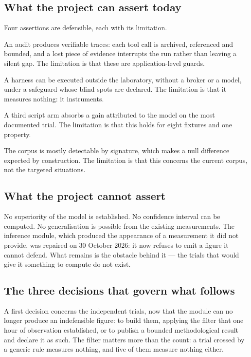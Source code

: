 \subsection{What the project can assert today}

Four assertions are defensible, each with its limitation.

An audit produces verifiable traces: each tool call is archived, referenced and bounded, and a lost piece of evidence interrupts the run rather than leaving a silent gap. The limitation is that these are application-level guards.

A harness can be executed outside the laboratory, without a broker or a model, under a safeguard whose blind spots are declared. The limitation is that it measures nothing: it instruments.

A third script arm absorbs a gain attributed to the model on the most documented trial. The limitation is that this holds for eight fixtures and one property.

The corpus is mostly detectable by signature, which makes a null difference expected by construction. The limitation is that this concerns the current corpus, not the targeted situations.

\subsection{What the project cannot assert}

No superiority of the model is established. No confidence interval can be computed. No generalisation is possible from the existing measurements. The inference module, which produced the appearance of a measurement it did not provide, was repaired on 30 October 2026: it now refuses to emit a figure it cannot defend. What remains is the obstacle behind it — the trials that would give it something to compute do not exist.

\subsection{The three decisions that govern what follows}

A first decision concerns the independent trials, now that the module can no longer produce an indefensible figure: to build them, applying the filter that one hour of observation established, or to publish a bounded methodological result and declare it as such. The filter matters more than the count: a trial crossed by a generic rule measures nothing, and five of them measure nothing either.

